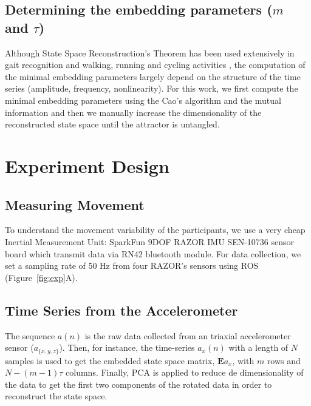 \documentclass{sigchi}
\begin{document}
\subsection{Determining the embedding parameters ($m$ and $\tau$)}
Although State Space Reconstruction's Theorem has been used extensively in gait
recognition and walking, running and cycling activities \cite{Frank2010,Sama2013},
the computation of the minimal embedding parameters largely depend on the
structure of the time series (amplitude, frequency, nonlinearity).
For this work, we first compute the minimal embedding parameters
using the Cao's algorithm \cite{Cao1997} and the mutual information
and then we manually increase the dimensionality of the reconstructed state
space until the attractor is untangled.

\section{Experiment Design}

\subsection{Measuring Movement}
To understand the movement variability of the participants, we use a very cheap
Inertial Measurement Unit: SparkFun 9DOF RAZOR IMU SEN-10736 sensor board
which transmit data via RN42 bluetooth module.
For data collection, we set a sampling rate of 50 Hz from four RAZOR's sensors
using ROS \cite{quigley2009} (Figure~\ref{fig:exp}A).

\subsection{Time Series from the Accelerometer}
The sequence $a(n)$ is the raw data collected from an triaxial accelerometer sensor
($a_{ \{ x,y,z \} }$). Then, for instance, the time-series $a_x(n)$
with a length of $N$ samples is used to get the embedded state space matrix,
$\boldsymbol{E} a_{x}$, with $m$ rows and $N-(m-1)\tau$ columns.
Finally, PCA is applied to reduce de dimensionality of the data
to get the first two components of the rotated data in order
to reconstruct the state space.
\end{document}
